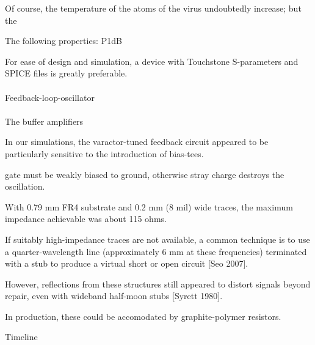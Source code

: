 \documentclass[fleqn,10pt]{article}
\begin{document}
Of course, the temperature of the atoms of the virus undoubtedly increase; but the 



\clearpage





\begin{multicols}{1}


The following properties: P1dB

For ease of design and simulation, a device with Touchstone S-parameters and SPICE files is greatly preferable.


\paragraph{} Feedback-loop-oscillator


\paragraph{}
The buffer amplifiers 

In our simulations, the varactor-tuned feedback circuit appeared to be particularly sensitive to the introduction of bias-tees. 


 gate must be weakly biased to ground, otherwise stray charge destroys the oscillation.




With 0.79 mm FR4 substrate and 0.2 mm (8 mil) wide traces, the maximum impedance achievable was about 115 ohms. 

If suitably high-impedance traces are not available, a common technique is to use a quarter-wavelength line (approximately 6 mm at these frequencies) terminated with a stub to produce a virtual short or open circuit [Seo 2007]. 

However, reflections from these structures still appeared to distort signals beyond repair, even with wideband half-moon stubs [Syrett 1980].

\noindent{}

In production, these could be accomodated by graphite-polymer resistors.


Timeline


\end{multicols}
\end{document}
